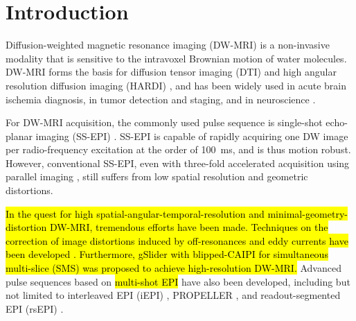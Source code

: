 \documentclass[preprint,12pt,authoryear,review]{elsarticle}
\begin{document}
    \pagebreak
    \linenumbers

    \section{Introduction}
    \label{SEC:Intr}

    Diffusion-weighted magnetic resonance imaging (DW-MRI)
    \citep{lebihan_1986_diff,merboldt_1985_diff} is a non-invasive modality
    that is sensitive to the intravoxel Brownian motion of water molecules.
    DW-MRI forms the basis for diffusion tensor imaging (DTI) \citep{basser_1994_dmri,mori_2001_track}
    and high angular resolution diffusion imaging (HARDI) \citep{tuch_2002_hardi},
    and has been widely used in acute brain ischemia diagnosis, in tumor detection and staging,
    and in neuroscience \citep{jones_2010_diff}.

    For DW-MRI acquisition, the commonly used pulse sequence is
    single-shot echo-planar imaging (SS-EPI) \citep{mansfield_1977_epi}.
    SS-EPI is capable of rapidly acquiring one DW image per radio-frequency excitation
    at the order of \SI{100}{\ms}, and is thus motion robust.
    However, conventional SS-EPI,
    even with three-fold accelerated acquisition \citep{bammer_2001_epi_sense}
    using parallel imaging
    \citep{roemer_1990_pi,ra_1993_sense,pruessmann_1999_sense,griswold_2002_grappa},
    still suffers from low spatial resolution and geometric distortions.

    \hl{In the quest for high spatial-angular-temporal-resolution
    and minimal-geometry-distortion DW-MRI,
    tremendous efforts have been made.
    Techniques on the correction of image distortions
    induced by off-resonances and eddy currents
    have been developed \mbox{\citep{andersson_2003_topup}}.
    Furthermore, gSlider \mbox{\citep{setsompop_2018_gslider}} with
    blipped-CAIPI \mbox{\citep{setsompop_2012_blipped}}
    for simultaneous multi-slice (SMS)
    \mbox{\citep{maudsley_1980_sms,breuer_2005_caipi}}
    was proposed to achieve high-resolution DW-MRI.}
    Advanced pulse sequences based on
    \hl{multi-shot EPI} have also been developed, 
    including but not limited to interleaved EPI (iEPI)
    \citep{butts_1993_iepi},
    PROPELLER \citep{pipe_2002_blade}, and
    readout-segmented EPI (rsEPI)
    \citep{porter_2009_resolve,heidemann_2010_resolve7t}.
\end{document}
